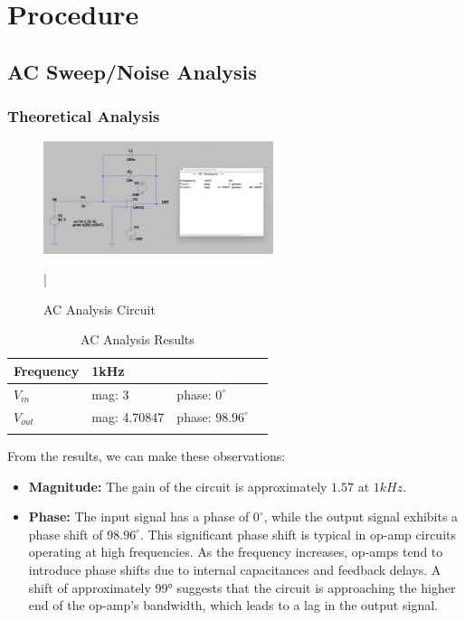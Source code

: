 \chapter{Procedure}

\section{AC Sweep/Noise Analysis}

\subsection{Theoretical Analysis}

\begin{figure}[h]
    \centering
    \includegraphics[width=0.6\textwidth]{assets/p1-1k.png}
    \caption{AC Analysis Circuit}
    \label{fig:ac-analysis-circuit}
|\end{figure}

\begin{table}[h]
    \centering
    \begin{tabular}{llll}
    \cline{1-2}
    \multicolumn{1}{|l|}{Frequency} & \multicolumn{1}{l|}{1kHz} &             &                              \\ \hline
    \multicolumn{1}{|l|}{$V_{in}$}     & mag: 3                    & phase: $0^{\circ}$    & \multicolumn{1}{l|}{} \\ \hline
    \multicolumn{1}{|l|}{$V_{out}$}    & mag: 4.70847               & phase: $98.96^{\circ}$ & \multicolumn{1}{l|}{} \\ \hline
                                    &                           &             &                             
    \end{tabular}
    \caption{AC Analysis Results}
    \label{tab:ac-sweep-analysis-results}
\end{table}

From the results, we can make these observations:

\begin{itemize}
    \item \textbf{Magnitude:} The gain of the circuit is approximately $1.57$ at $1kHz$. 
    \item \textbf{Phase:} The input signal has a phase of $0^{\circ}$, while the output signal exhibits a phase shift of $98.96^{\circ}$. This significant phase shift is typical in op-amp circuits operating at high frequencies. As the frequency increases, op-amps tend to introduce phase shifts due to internal capacitances and feedback delays. A shift of approximately 99° suggests that the circuit is approaching the higher end of the op-amp’s bandwidth, which leads to a lag in the output signal.
\end{itemize}


